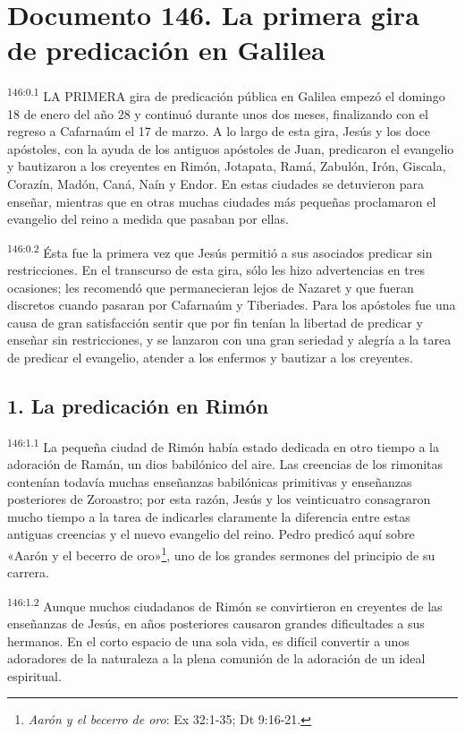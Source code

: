 \chapter{Documento 146. La primera gira de predicación en Galilea}
\par
\textsuperscript{146:0.1} LA PRIMERA gira de predicación pública en Galilea empezó el domingo 18 de enero del año 28 y continuó durante unos dos meses, finalizando con el regreso a Cafarnaúm el 17 de marzo. A lo largo de esta gira, Jesús y los doce apóstoles, con la ayuda de los antiguos apóstoles de Juan, predicaron el evangelio y bautizaron a los creyentes en Rimón, Jotapata, Ramá, Zabulón, Irón, Giscala, Corazín, Madón, Caná, Naín y Endor. En estas ciudades se detuvieron para enseñar, mientras que en otras muchas ciudades más pequeñas proclamaron el evangelio del reino a medida que pasaban por ellas.

\par
\textsuperscript{146:0.2} Ésta fue la primera vez que Jesús permitió a sus asociados predicar sin restricciones. En el transcurso de esta gira, sólo les hizo advertencias en tres ocasiones; les recomendó que permanecieran lejos de Nazaret y que fueran discretos cuando pasaran por Cafarnaúm y Tiberiades. Para los apóstoles fue una causa de gran satisfacción sentir que por fin tenían la libertad de predicar y enseñar sin restricciones, y se lanzaron con una gran seriedad y alegría a la tarea de predicar el evangelio, atender a los enfermos y bautizar a los creyentes.

\section*{1. La predicación en Rimón}
\par
\textsuperscript{146:1.1} La pequeña ciudad de Rimón había estado dedicada en otro tiempo a la adoración de Ramán, un dios babilónico del aire. Las creencias de los rimonitas contenían todavía muchas enseñanzas babilónicas primitivas y enseñanzas posteriores de Zoroastro; por esta razón, Jesús y los veinticuatro consagraron mucho tiempo a la tarea de indicarles claramente la diferencia entre estas antiguas creencias y el nuevo evangelio del reino. Pedro predicó aquí sobre «Aarón y el becerro de oro»\footnote{\textit{Aarón y el becerro de oro}: Ex 32:1-35; Dt 9:16-21.}, uno de los grandes sermones del principio de su carrera.

\par
\textsuperscript{146:1.2} Aunque muchos ciudadanos de Rimón se convirtieron en creyentes de las enseñanzas de Jesús, en años posteriores causaron grandes dificultades a sus hermanos. En el corto espacio de una sola vida, es difícil convertir a unos adoradores de la naturaleza a la plena comunión de la adoración de un ideal espiritual.

